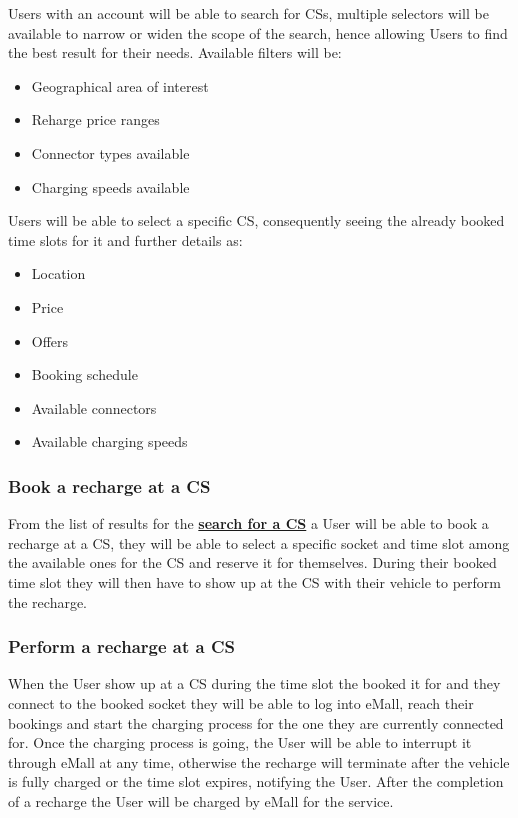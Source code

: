 \documentclass[11pt]{article}
\begin{document}
Users with an account will be able to search for CSs, multiple selectors will be available to narrow or widen the scope of the search, hence allowing Users to find the best result for their needs. Available filters will be:
\begin{itemize}
    \item Geographical area of interest
    \item Reharge price ranges
    \item Connector types available
    \item Charging speeds available
\end{itemize}
Users will be able to select a specific CS, consequently seeing the already booked time slots for it and further details as:
\begin{itemize}
    \item Location
    \item Price
    \item Offers
    \item Booking schedule
    \item Available connectors
    \item Available charging speeds
\end{itemize}

\subsubsection{Book a recharge at a CS}

From the list of results for the \hyperref[subsubsection:searchForCS]{\textbf{search for a CS}} a User will be able to book a recharge at a CS, they will be able to select a specific socket and time slot among the available ones for the CS and reserve it for themselves. During their booked time slot they will then have to show up at the CS with their vehicle to perform the recharge.

\subsubsection{Perform a recharge at a CS}

When the User show up at a CS during the time slot the booked it for and they connect to the booked socket they will be able to log into eMall, reach their bookings and start the charging process for the one they are currently connected for. Once the charging process is going, the User will be able to interrupt it through eMall at any time, otherwise the recharge will terminate after the vehicle is fully charged or the time slot expires, notifying the User. After the completion of a recharge the User will be charged by eMall for the service.
\end{document}
